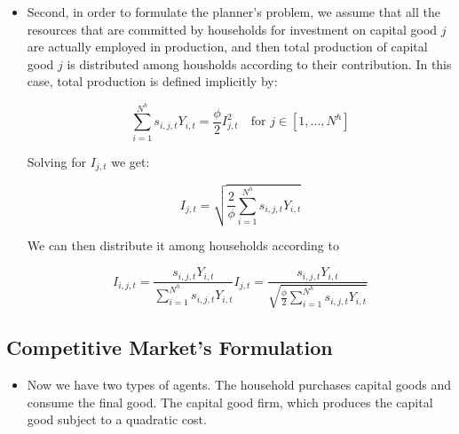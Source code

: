 \documentclass[11pt,english]{article}
\begin{document}
\begin{itemize}
\begin{itemize}
		\item Second, in order to formulate the planner's problem, we assume that all the resources that are committed by households for investment on capital good $j$ are actually employed in production, and then total production of capital good $j$ is distributed among housholds according to their contribution. In this case, total production is defined implicitly by:
		
		$$\sum_{i=1}^{N^h} s_{i,j,t} Y_{i,t} = \frac{\phi}{2} I_{j,t}^2 \quad \text{for } j \in [1,...,N^h]$$
		
		Solving for $I_{j,t}$ we get:
		
		$$I_{j,t} =  \sqrt{\frac{2}{\phi} \sum_{i=1}^{N^h} s_{i,j,t} Y_{i,t}}$$
		
		We can then distribute it among households according to
		
		$$I_{i,j,t} = \frac{s_{i,j,t}Y_{i,t}}{ \sum_{i=1}^{N^h} s_{i,j,t} Y_{i,t}}  I_{j,t} =   \frac{s_{i,j,t}Y_{i,t}}{\sqrt{\frac{\phi}{2} \sum_{i=1}^{N^h} s_{i,j,t} Y_{i,t}}}$$
		
	\end{itemize}  
\end{itemize}


\subsection{Competitive Market's Formulation}

\begin{itemize}
	\item Now we have two types of agents.  The household purchases capital goods and consume the final good.  The capital good firm, which produces the capital good subject to a quadratic cost. 
\end{itemize}
\end{document}

